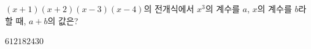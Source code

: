$(x+1)(x+2)(x-3)(x-4)$의 전개식에서 $x^3$의 계수를 $a$, $x$의 계수를 $b$라 할 때, $a+b$의 값은?
\begin{choices32}{$6$}{$12$}{$18$}{$24$}{$30$}\end{choices32}
